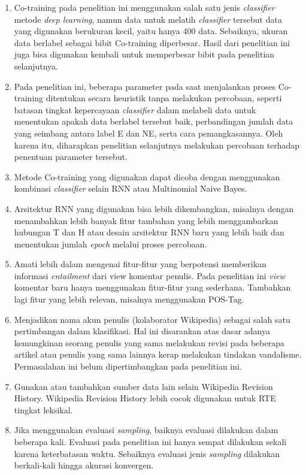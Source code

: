 \begin{enumerate}
	\item Co-training pada penelitian ini menggunakan salah satu jenis \textit{classifier} metode \textit{deep learning}, namun data untuk melatih \textit{classifier} tersebut data yang digunakan berukuran kecil, yaitu hanya 400 data. Sebaiknya, ukuran data berlabel sebagai bibit Co-training diperbesar. Hasil dari penelitian ini juga bisa digunakan kembali untuk memperbesar bibit pada penelitian selanjutnya.
	\item Pada penelitian ini, beberapa parameter pada saat menjalankan proses Co-training ditentukan secara heuristik tanpa melakukan percobaan, seperti batasan tingkat kepercayaan \textit{classifier} dalam melabeli data untuk menentukan apakah data berlabel tersebut baik, perbandingan jumlah data yang seimbang antara label E dan NE, serta cara pemangkasannya. Oleh karena itu, diharapkan penelitian selanjutnya melakukan percobaan terhadap penentuan parameter tersebut.
	\item Metode Co-training yang digunakan dapat dicoba dengan menggunakan kombinasi \textit{classifier} selain RNN atau Multinomial Naive Bayes. 
	\item Arsitektur RNN yang digunakan bisa lebih dikembangkan, misalnya dengan menambahkan lebih banyak fitur tambahan yang lebih menggambarkan hubungan T dan H atau desain arsitektur RNN baru yang lebih baik dan menentukan jumlah \textit{epoch} melalui proses percobaan.
	\item Amati lebih dalam mengenai fitur-fitur yang berpotensi memberikan informasi \textit{entailment} dari view komentar penulis. Pada penelitian ini \textit{view} komentar baru hanya menggunakan fitur-fitur yang sederhana. Tambahkan lagi fitur yang lebih relevan, misalnya menggunakan POS-Tag.
	\item Menjadikan nama akun penulis (kolaborator Wikipedia) sebagai salah satu pertimbangan dalam klasifikasi. Hal ini disarankan atas dasar adanya kemungkinan seorang penulis yang sama melakukan revisi pada beberapa artikel atau penulis yang sama lainnya kerap melakukan tindakan vandalisme. Permasalahan ini belum dipertimbangkan pada penelitian ini.
	\item Gunakan atau tambahkan sumber data lain selain Wikipedia Revision History. Wikipedia Revision History lebih cocok digunakan untuk RTE tingkat leksikal. 
	\item Jika menggunakan evaluasi \textit{sampling}, baiknya evaluasi dilakukan dalam beberapa kali. Evaluasi pada penelitian ini hanya sempat dilakukan sekali karena keterbatasan waktu. Sebaiknya evaluasi jenis \textit{sampling} dilakukan berkali-kali hingga akurasi konvergen.
\end{enumerate}